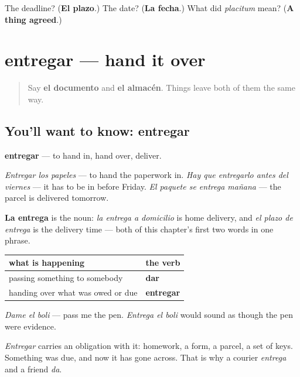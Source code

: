 \begin{tcolorbox}[breakable,colback=teal!4,colframe=teal!35!black,title={Before you move on}]
The deadline? (\textbf{El plazo}.) The date? (\textbf{La fecha}.) What did \emph{placitum} mean? (\textbf{A thing agreed}.)
\end{tcolorbox}
\section[entregar]{entregar — hand it over}

\label{lesson:ES-C458-entregar}



\begin{quote}
Say \textbf{el documento} and \textbf{el almacén}. Things leave both of them the same way.
\end{quote}

\subsection*{You'll want to know: entregar}
\textbf{entregar} — to hand in, hand over, deliver.

\emph{Entregar los papeles} — to hand the paperwork in. \emph{Hay que entregarlo antes del viernes} — it has to be in before Friday. \emph{El paquete se entrega mañana} — the parcel is delivered tomorrow.

\textbf{La entrega} is the noun: \emph{la entrega a domicilio} is home delivery, and \emph{el plazo de entrega} is the delivery time — both of this chapter's first two words in one phrase.

\begin{grammarlens}[title={Grammar Lens: entregar is not dar}]
\noindent
\begin{tabularx}{\linewidth}{@{}>{\raggedright\arraybackslash}X>{\raggedright\arraybackslash}X@{}}
\toprule
\textbf{what is happening} & \textbf{the verb} \\
\midrule
passing something to somebody & \textbf{dar} \\
handing over what was owed or due & \textbf{entregar} \\
\bottomrule
\end{tabularx}

\emph{Dame el boli} — pass me the pen. \emph{Entrega el boli} would sound as though the pen were evidence.

\emph{Entregar} carries an obligation with it: homework, a form, a parcel, a set of keys. Something was due, and now it has gone across. That is why a courier \emph{entrega} and a friend \emph{da}.
\end{grammarlens}

